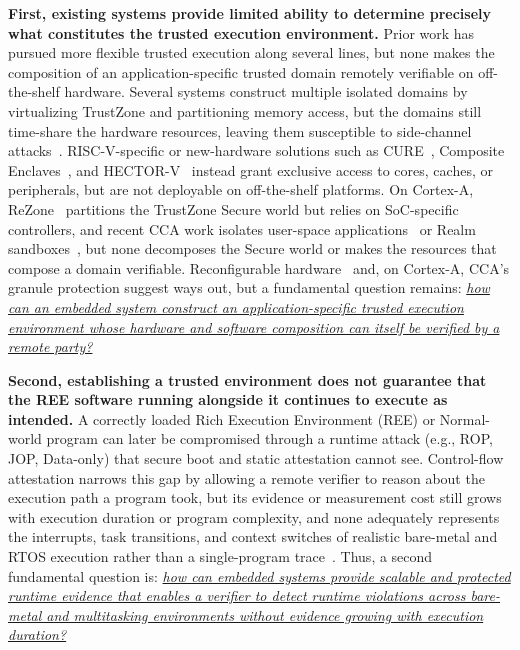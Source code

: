 \textbf{First, existing systems provide limited ability to determine precisely what constitutes the trusted execution environment.}
Prior work has pursued more flexible trusted execution along several lines, but none makes the composition of an application-specific trusted domain remotely verifiable on off-the-shelf hardware.
Several systems construct multiple isolated domains by virtualizing TrustZone and partitioning memory access, but the domains still time-share the hardware resources, leaving them susceptible to side-channel attacks~\cite{hua2017vtz,brasser2019sanctuary,Keystone2020}.
RISC-V-specific or new-hardware solutions such as CURE~\cite{bahmani2021cure}, Composite Enclaves~\cite{schneider2020pie}, and HECTOR-V~\cite{nasahl2020hector} instead grant exclusive access to cores, caches, or peripherals, but are not deployable on off-the-shelf platforms.
On Cortex-A, ReZone~\cite{cerdeira2022rezone} partitions the TrustZone Secure world but relies on SoC-specific controllers, and recent CCA work isolates user-space applications~\cite{zhang2023shelter} or Realm sandboxes~\cite{kuhne2024aster}, but none decomposes the Secure world or makes the resources that compose a domain verifiable.
Reconfigurable hardware~\cite{armanuzzaman2024building} and, on Cortex-A, CCA's granule protection suggest ways out, but a fundamental question remains: \emph{\ul{how can an embedded system construct an application-specific trusted execution environment whose hardware and software composition can itself be verified by a remote party?}}

\textbf{Second, establishing a trusted environment does not guarantee that the REE software running alongside it continues to execute as intended.}
A correctly loaded Rich Execution Environment (REE) or Normal-world program can later be compromised through a runtime attack (e.g., ROP, JOP, Data-only) that secure boot and static attestation cannot see.
Control-flow attestation narrows this gap by allowing a remote verifier to reason about the execution path a program took, but its evidence or measurement cost still grows with execution duration or program complexity, and none adequately represents the interrupts, task transitions, and context switches of realistic bare-metal and RTOS execution rather than a single-program trace~\cite{abera2016c,sun2020oat,wangari,yadav2023whole}.
Thus, a second fundamental question is: \emph{\ul{how can embedded systems provide scalable and protected runtime evidence that enables a verifier to detect runtime violations across bare-metal and multitasking environments without evidence growing with execution duration?}}

